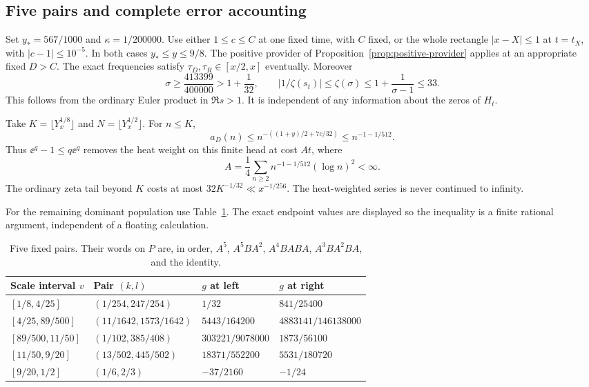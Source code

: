 \subsection{Five pairs and complete error accounting}

Set $y_*=567/1000$ and $\kappa=1/200000$.
Use either $1\le c\le C$ at one fixed time, with $C$ fixed, or the
whole rectangle $|x-X|\le1$ at $t=t_X$, with $|c-1|\le10^{-5}$.
In both cases $y_*\le y\le9/8$. The positive provider of
Proposition~\ref{prop:positive-provider} applies at an appropriate
fixed $D>C$. The exact frequencies satisfy $\tau_D,\tau_R\in[x/2,x]$
eventually. Moreover
\begin{equation}\label{eq:carrier-floor-33}
 \sigma\ge\frac{413399}{400000}>1+\frac1{32},\qquad
 |1/\zeta(s_t)|\le\zeta(\sigma)\le1+\frac1{\sigma-1}\le33.
\end{equation}
This follows from the ordinary Euler product in $\Re s>1$.
It is independent of any information about the zeros of $H_t$.

Take $K=\lfloor Y_x^{1/8}\rfloor$ and $N=\lfloor Y_x^{1/2}\rfloor$.
For $n\le K$,
\[
 a_D(n)\le n^{-((1+y)/2+7c/32)}\le n^{-1-1/512}.
\]
Thus $\ee^q-1\le q\ee^q$ removes the heat weight on this finite head
at cost $At$, where
\begin{equation}\label{eq:A-constant}
 A=\frac14\sum_{n\ge2}n^{-1-1/512}(\log n)^2<\infty.
\end{equation}
The ordinary zeta tail beyond $K$ costs at most
$32K^{-1/32}\ll x^{-1/256}$. The heat-weighted series is never
continued to infinity.

For the remaining dominant population use Table~\ref{tab:pairs}.
The exact endpoint values are displayed so the inequality is a finite
rational argument, independent of a floating calculation.
\begin{table}[htbp]
\centering\small
\begin{tabular}{@{}llll@{}}
\toprule
Scale interval $v$ & Pair $(k,l)$ & $g$ at left & $g$ at right\\
\midrule
$[1/8,4/25]$ & $(1/254,247/254)$ & $1/32$ & $841/25400$\\
$[4/25,89/500]$ & $(11/1642,1573/1642)$ & $5443/164200$ & $4883141/146138000$\\
$[89/500,11/50]$ & $(1/102,385/408)$ & $303221/9078000$ & $1873/56100$\\
$[11/50,9/20]$ & $(13/502,445/502)$ & $18371/552200$ & $5531/180720$\\
$[9/20,1/2]$ & $(1/6,2/3)$ & $-37/2160$ & $-1/24$\\
\bottomrule
\end{tabular}
\caption{Five fixed pairs. Their words on $P$ are, in order,
$A^5$, $A^5BA^2$, $A^4BABA$, $A^3BA^2BA$, and the identity.}
\label{tab:pairs}
\end{table}

